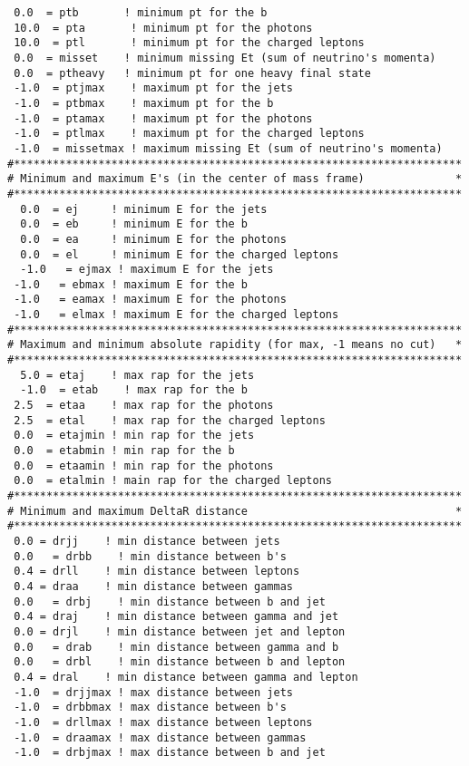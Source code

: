 \begin{enumerate}
\begin{lstlisting}
 0.0  = ptb       ! minimum pt for the b 
 10.0  = pta       ! minimum pt for the photons 
 10.0  = ptl       ! minimum pt for the charged leptons 
 0.0  = misset    ! minimum missing Et (sum of neutrino's momenta)
 0.0  = ptheavy   ! minimum pt for one heavy final state
 -1.0  = ptjmax    ! maximum pt for the jets
 -1.0  = ptbmax    ! maximum pt for the b
 -1.0  = ptamax    ! maximum pt for the photons
 -1.0  = ptlmax    ! maximum pt for the charged leptons
 -1.0  = missetmax ! maximum missing Et (sum of neutrino's momenta)
#*********************************************************************
# Minimum and maximum E's (in the center of mass frame)              *
#*********************************************************************
  0.0  = ej     ! minimum E for the jets 
  0.0  = eb     ! minimum E for the b 
  0.0  = ea     ! minimum E for the photons 
  0.0  = el     ! minimum E for the charged leptons 
  -1.0   = ejmax ! maximum E for the jets
 -1.0   = ebmax ! maximum E for the b
 -1.0   = eamax ! maximum E for the photons
 -1.0   = elmax ! maximum E for the charged leptons
#*********************************************************************
# Maximum and minimum absolute rapidity (for max, -1 means no cut)   *
#*********************************************************************
  5.0 = etaj    ! max rap for the jets 
  -1.0  = etab    ! max rap for the b
 2.5  = etaa    ! max rap for the photons 
 2.5  = etal    ! max rap for the charged leptons 
 0.0  = etajmin ! min rap for the jets
 0.0  = etabmin ! min rap for the b
 0.0  = etaamin ! min rap for the photons
 0.0  = etalmin ! main rap for the charged leptons
#*********************************************************************
# Minimum and maximum DeltaR distance                                *
#*********************************************************************
 0.0 = drjj    ! min distance between jets 
 0.0   = drbb    ! min distance between b's 
 0.4 = drll    ! min distance between leptons 
 0.4 = draa    ! min distance between gammas 
 0.0   = drbj    ! min distance between b and jet 
 0.4 = draj    ! min distance between gamma and jet 
 0.0 = drjl    ! min distance between jet and lepton 
 0.0   = drab    ! min distance between gamma and b 
 0.0   = drbl    ! min distance between b and lepton 
 0.4 = dral    ! min distance between gamma and lepton 
 -1.0  = drjjmax ! max distance between jets
 -1.0  = drbbmax ! max distance between b's
 -1.0  = drllmax ! max distance between leptons
 -1.0  = draamax ! max distance between gammas
 -1.0  = drbjmax ! max distance between b and jet

\end{lstlisting}
\end{enumerate}
